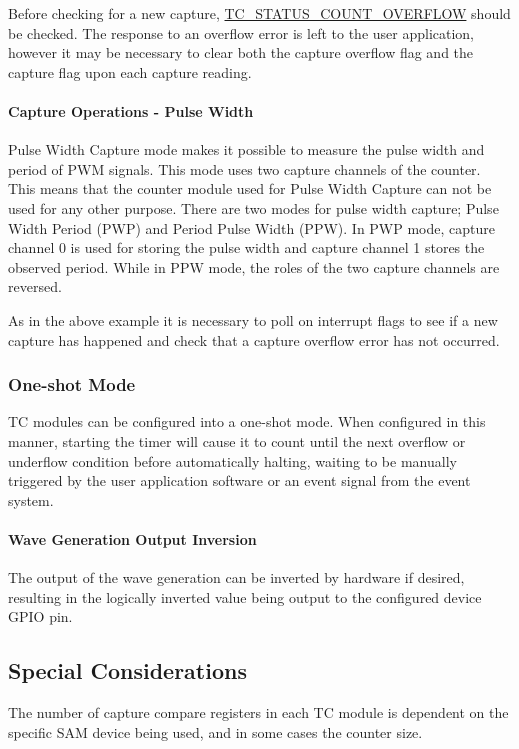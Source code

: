 Before checking for a new capture, \mbox{\hyperlink{group__asfdoc__sam0__tc__group_gada6e9a6bd144c0c2e360d1fdef944cdd}{T\+C\+\_\+\+S\+T\+A\+T\+U\+S\+\_\+\+C\+O\+U\+N\+T\+\_\+\+O\+V\+E\+R\+F\+L\+OW}} should be checked. The response to an overflow error is left to the user application, however it may be necessary to clear both the capture overflow flag and the capture flag upon each capture reading.\hypertarget{group__asfdoc__sam0__tc__group_asfdoc_sam0_tc_module_overview_compare_match_capt_pwc}{}\paragraph{Capture Operations -\/ Pulse Width}\label{group__asfdoc__sam0__tc__group_asfdoc_sam0_tc_module_overview_compare_match_capt_pwc}
Pulse Width Capture mode makes it possible to measure the pulse width and period of P\+WM signals. This mode uses two capture channels of the counter. This means that the counter module used for Pulse Width Capture can not be used for any other purpose. There are two modes for pulse width capture; Pulse Width Period (P\+WP) and Period Pulse Width (P\+PW). In P\+WP mode, capture channel 0 is used for storing the pulse width and capture channel 1 stores the observed period. While in P\+PW mode, the roles of the two capture channels are reversed.

As in the above example it is necessary to poll on interrupt flags to see if a new capture has happened and check that a capture overflow error has not occurred.\hypertarget{group__asfdoc__sam0__tc__group_asfdoc_sam0_tc_module_overview_oneshot}{}\subsubsection{One-\/shot Mode}\label{group__asfdoc__sam0__tc__group_asfdoc_sam0_tc_module_overview_oneshot}
TC modules can be configured into a one-\/shot mode. When configured in this manner, starting the timer will cause it to count until the next overflow or underflow condition before automatically halting, waiting to be manually triggered by the user application software or an event signal from the event system.\hypertarget{group__asfdoc__sam0__tc__group_asfdoc_sam0_tc_module_overview_inversion}{}\paragraph{Wave Generation Output Inversion}\label{group__asfdoc__sam0__tc__group_asfdoc_sam0_tc_module_overview_inversion}
The output of the wave generation can be inverted by hardware if desired, resulting in the logically inverted value being output to the configured device G\+P\+IO pin.\hypertarget{group__asfdoc__sam0__tc__group_asfdoc_sam0_tc_special_considerations}{}\subsection{Special Considerations}\label{group__asfdoc__sam0__tc__group_asfdoc_sam0_tc_special_considerations}
The number of capture compare registers in each TC module is dependent on the specific S\+AM device being used, and in some cases the counter size.

